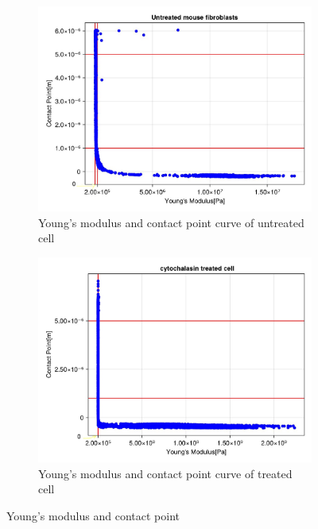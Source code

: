 \documentclass[a4paper,english,12pt,bibliography=totoc]{scrreprt}
\begin{document}


\begin{figure}[H]
    \begin{subfigure}{0.45\textwidth}
        \centering
        \includegraphics[width=\textwidth]{untreated/ym-cp-curve-untreated-labelled.jpeg}
        \caption{Young's modulus and contact point curve of untreated cell}
        \label{fig:ym_cp_curve_untreated}
    \end{subfigure}
    \begin{subfigure}{0.45\textwidth}
        \centering
        \includegraphics[width=\textwidth]{treated/ym-cp-curve-treated-labelled.jpeg}
        \caption{Young's modulus and contact point curve of treated cell}
        \label{fig:ym_cp_curve_treated}
    \end{subfigure}
    \caption{Young's modulus and contact point}
    \label{fig:ym_cp_curve}
\end{figure}
\end{document}
